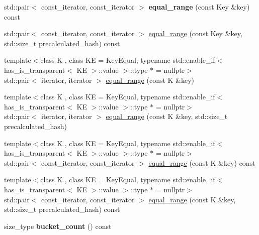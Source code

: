 \begin{DoxyCompactItemize}
\mbox{\label{classtsl_1_1robin__map_a3184679c60bc428b907e8260c079ba15}} 
std\+::pair$<$ const\+\_\+iterator, const\+\_\+iterator $>$ {\bfseries equal\+\_\+range} (const Key \&key) const
\item 
std\+::pair$<$ const\+\_\+iterator, const\+\_\+iterator $>$ \mbox{\hyperlink{classtsl_1_1robin__map_a838ba4ebaedcbb3a250af31e80344f32}{equal\+\_\+range}} (const Key \&key, std\+::size\+\_\+t precalculated\+\_\+hash) const
\item 
{\footnotesize template$<$class K , class KE  = Key\+Equal, typename std\+::enable\+\_\+if$<$ has\+\_\+is\+\_\+transparent$<$ K\+E $>$\+::value $>$\+::type $\ast$  = nullptr$>$ }\\std\+::pair$<$ iterator, iterator $>$ \mbox{\hyperlink{classtsl_1_1robin__map_a1b976b054cf9377a097186905ccfcb67}{equal\+\_\+range}} (const K \&key)
\item 
{\footnotesize template$<$class K , class KE  = Key\+Equal, typename std\+::enable\+\_\+if$<$ has\+\_\+is\+\_\+transparent$<$ K\+E $>$\+::value $>$\+::type $\ast$  = nullptr$>$ }\\std\+::pair$<$ iterator, iterator $>$ \mbox{\hyperlink{classtsl_1_1robin__map_ac6bf6f34c1547cc8d7ec9c503c8cd748}{equal\+\_\+range}} (const K \&key, std\+::size\+\_\+t precalculated\+\_\+hash)
\item 
{\footnotesize template$<$class K , class KE  = Key\+Equal, typename std\+::enable\+\_\+if$<$ has\+\_\+is\+\_\+transparent$<$ K\+E $>$\+::value $>$\+::type $\ast$  = nullptr$>$ }\\std\+::pair$<$ const\+\_\+iterator, const\+\_\+iterator $>$ \mbox{\hyperlink{classtsl_1_1robin__map_a7c8ee179d4ade6d69e13137c2acc8e9a}{equal\+\_\+range}} (const K \&key) const
\item 
{\footnotesize template$<$class K , class KE  = Key\+Equal, typename std\+::enable\+\_\+if$<$ has\+\_\+is\+\_\+transparent$<$ K\+E $>$\+::value $>$\+::type $\ast$  = nullptr$>$ }\\std\+::pair$<$ const\+\_\+iterator, const\+\_\+iterator $>$ \mbox{\hyperlink{classtsl_1_1robin__map_a28420206c36fc95862a481555dc63d1f}{equal\+\_\+range}} (const K \&key, std\+::size\+\_\+t precalculated\+\_\+hash) const
\item 
\mbox{\label{classtsl_1_1robin__map_a47517c7eb45e81826de5d688fd567739}} 
size\+\_\+type {\bfseries bucket\+\_\+count} () const
\item 

\end{DoxyCompactItemize}
